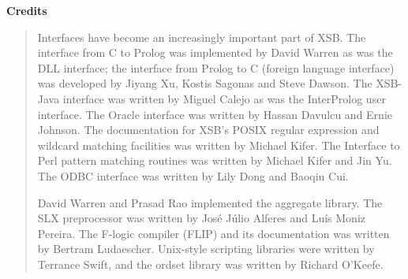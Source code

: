 
\begin{center}
{\bf {\Large 
		Credits
}}
\end{center}


\begin{quote}
  Interfaces have become an increasingly important part of XSB.  The
  interface from C to Prolog was implemented by David Warren as was the DLL
  interface; the interface from Prolog to C (foreign language interface)
  was developed by Jiyang Xu, Kostis Sagonas and Steve Dawson.  The
  XSB-Java interface was written by Miguel Calejo as was the InterProlog
  user interface.  The Oracle interface was written by Hassan Davulcu and
  Ernie Johnson. The documentation for XSB's POSIX regular expression and
  wildcard matching facilities was written by Michael Kifer.  The Interface
  to Perl pattern matching routines was written by Michael Kifer and Jin
  Yu.  The ODBC interface was written by Lily Dong and Baoqiu Cui.

David Warren and Prasad Rao implemented the aggregate library.  The SLX
preprocessor was written by Jos\'e J\'ulio Alferes and Lu\'is Moniz
Pereira.  The F-logic compiler (FLIP) and its documentation was written by
Bertram Ludaescher.  Unix-style scripting libraries were written by
Terrance Swift, and the ordset library was written by Richard O'Keefe.
\end{quote}

